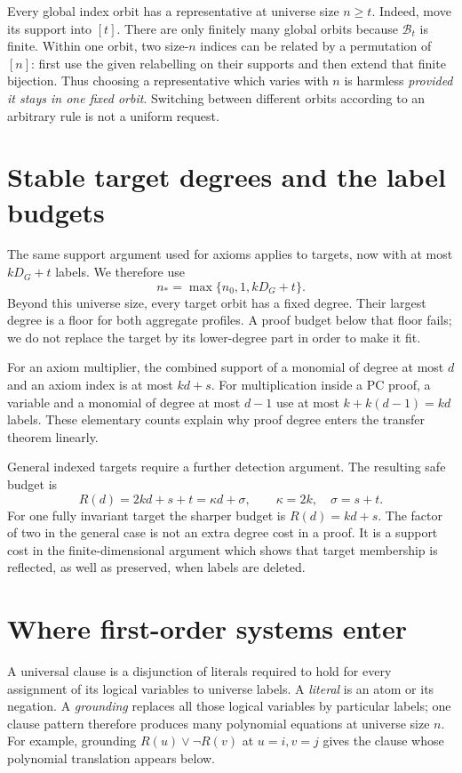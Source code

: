 \documentclass[11pt,a4paper,oneside,openany]{book}
\theoremstyle{definition}\newtheorem{definition}[theorem]{Definition}
\theoremstyle{remark}\newtheorem{remark}[theorem]{Remark}
\numberwithin{equation}{chapter}
\begin{document}
Every global index orbit has a representative at universe size $n\ge t$.
Indeed, move its support into $[t]$. There are only finitely many global
orbits because $\mathcal B_t$ is finite. Within one orbit, two size-$n$
indices can be related by a permutation of $[n]$: first use the given
relabelling on their supports and then extend that finite bijection.
Thus choosing a representative which varies with $n$ is harmless
\emph{provided it stays in one fixed orbit}. Switching between different
orbits according to an arbitrary rule is not a uniform request.

\section{Stable target degrees and the label budgets}\label{tx:sec:target-budgets}
The same support argument used for axioms applies to targets, now with
at most $kD_G+t$ labels. We therefore use
\begin{equation}\label{tx:eq:stable-rank}
                          n_*=\max\{n_0,1,kD_G+t\}.
\end{equation}
Beyond this universe size, every target orbit has a fixed degree. Their largest
degree is a floor for both aggregate profiles. A proof budget below
that floor fails; we do not replace the target by its lower-degree
part in order to make it fit.

For an axiom multiplier, the combined support of a monomial of degree
at most $d$ and an axiom index is at most $kd+s$. For multiplication
inside a PC proof, a variable and a monomial of degree at most $d-1$
use at most $k+k(d-1)=kd$ labels. These elementary counts explain why
proof degree enters the transfer theorem linearly.

General indexed targets require a further detection argument. The
resulting safe budget is
\begin{equation}\label{tx:eq:support-budget}
                R(d)=2kd+s+t=\kappa d+\sigma,
                    \qquad\kappa=2k,\quad\sigma=s+t.
\end{equation}
For one fully invariant target the sharper budget is $R(d)=kd+s$.
The factor of two in the general case is not an extra degree cost in a
proof. It is a support cost in the finite-dimensional argument which
shows that target membership is reflected, as well as preserved, when
labels are deleted.

\section{Where first-order systems enter}
A universal clause is a disjunction of literals required to hold for
every assignment of its logical variables to universe labels. A
\emph{literal} is an atom or its negation. A \emph{grounding} replaces
all those logical variables by particular labels; one clause pattern
therefore produces many polynomial equations at universe size $n$.
For example, grounding $R(u)\vee\neg R(v)$ at $u=i,v=j$ gives the
clause whose polynomial translation appears below.
\end{document}
